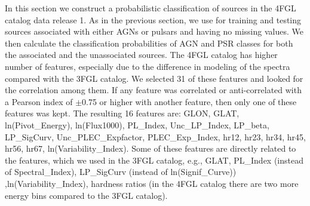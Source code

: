 In this section we construct a probabilistic classification of sources in the 4FGL catalog data release 1.
As in the previous section, we use for training and testing sources associated with either AGNs or pulsars and having no missing values.
We then calculate the classification probabilities of AGN and PSR classes for both the associated and the unassociated sources.
The 4FGL catalog has higher number of features, especially due to the difference in modeling of the spectra compared with the 3FGL catalog. 
We selected 31 of these features and looked for the correlation among them. If any feature was correlated or anti-correlated with a Pearson index of $\pm$0.75 or higher with another feature, then only one of these features was kept. 
The resulting 16 features are:
GLON, GLAT, ln(Pivot\_Energy), ln(Flux1000), PL\_Index, Unc\_LP\_Index, LP\_beta, LP\_SigCurv, Unc\_PLEC\_Expfactor, PLEC\_Exp\_Index, hr12, hr23, hr34, hr45, hr56, hr67, ln(Variability\_Index).
Some of these features are directly related to the features, which we used in the 3FGL catalog,
e.g., GLAT, PL\_Index (instead of Spectral\_Index), LP\_SigCurv (instead of ln(Signif\_Curve)) 
,ln(Variability\_Index), hardness ratios (in the 4FGL catalog there are two more energy bins compared to the 3FGL catalog).

